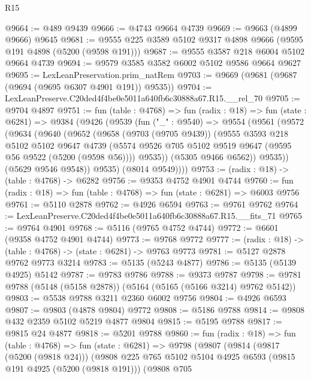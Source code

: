 \begin{lexlean}{R15}
\begin{coremodule}
{{{{{{{{{{{@9664 := @489 @9439
@9666 := @4743 @9664 @4739
@9669 := @9663 (@4899 @9666) @9645
@9681 := @9555 @225 @3589 @5102 @9317 @4898 @9666 (@9595 @191 @4898 (@5200 (@9598 @191)))
@9687 := @9555 @3587 @218 @6004 @5102 @9664 @4739
@9694 := @9579 @3585 @3582 @6002 @5102 @9586 @9664 @9627
@9695 := LexLeanPreservation.prim_natRem
@9703 := @9669 (@9681 (@9687 (@9694 (@9695 @6307 @4901 @191)) @9535))
@9704 := LexLeanPreserve.C20ded4f4be0e5011a640fb6c30888a67.R15.__rel_70
@9705 := @9704 @4897
@9751 := fun (table : @4768) =>
  fun (radix : @18) =>
  fun (state : @6281) =>
  @9384
    (@9426
      (@9539
        (fun ("_" : @9540) =>
        @9554
          (@9561
            (@9572
              (@9634
                (@9640
                  (@9652
                    (@9658
                      (@9703 (@9705 @9439))
                      (@9555
                        @3593
                        @218
                        @5102
                        @5102
                        @9647
                        @4739
                        (@5574 @9526 @705 @5102 @9519 @9647 (@9595 @56 @9522 (@5200 (@9598 @56))))
                        @9535))
                    (@5305 @9466 @6562))
                  @9535))
              (@5629 @9546 @9548))
            @9535)
          (@8014 @9549))))
@9753 := (radix : @18) -> (table : @4768) -> @6282
@9756 := @9353 @4752 @4901 @4744
@9760 := fun (radix : @18) => fun (table : @4768) => fun (state : @6281) => @6003 @9756
@9761 := @5110 @2878
@9762 := @4926 @6594
@9763 := @9761 @9762
@9764 := LexLeanPreserve.C20ded4f4be0e5011a640fb6c30888a67.R15.__fits_71
@9765 := @9764 @4901
@9768 := @5116 (@9765 @4752 @4744)
@9772 := @6601 (@9358 @4752 @4901 @4744)
@9773 := @9768 @9772
@9777 := (radix : @18) -> (table : @4768) -> (state : @6281) -> @9763 @9773
@9781 := @5127 @2878 @9762 @9773 @3214
@9783 := @5135 (@5243 @4877)
@9786 := @5135 (@5139 @4925) @5142
@9787 := @9783 @9786
@9788 := @9373 @9787
@9798 := @9781 @9788 (@5148 (@5158 @2878)) (@5164 (@5165 (@5166 @3214) @9762 @5142))
@9803 := @5538 @9788 @3211 @2360 @6002 @9756
@9804 := @4926 @6593
@9807 := @9803 (@4878 @9804) @9772
@9808 := @5186 @9788
@9814 := @9808 @432 @2359 @5102 @5219 @4877 @9804
@9815 := @5195 @9788
@9817 := @9815 @24 @4877
@9818 := @5201 @9788
@9860 := fun (radix : @18) =>
  fun (table : @4768) =>
  fun (state : @6281) =>
  @9798
    (@9807
      (@9814
        (@9817 (@5200 (@9818 @24)))
        (@9808
          @225
          @765
          @5102
          @5104
          @4925
          @6593
          (@9815 @191 @4925 (@5200 (@9818 @191)))
          (@9808
            @705
}}}}}}}}}}}
\end{coremodule}
\end{lexlean}

